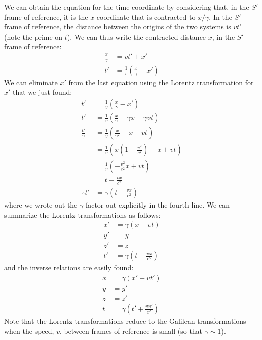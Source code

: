 We can obtain the equation for the time coordinate by considering that, in the $S'$ frame of reference, it is the $x$ coordinate that is contracted to $x/\gamma$. In the $S'$ frame of reference, the distance between the origins of the two systems is $vt'$ (note the prime on $t$). We can thus write the contracted distance $x$, in the $S'$ frame of reference:
\begin{align*}
\frac{x}{\gamma}&=vt'+x'\\
t'&= \frac{1}{v}\left(\frac{x}{\gamma}-x'\right)
\end{align*}
We can eliminate $x'$ from the last equation using the Lorentz transformation for $x'$ that we just found:
\begin{align*}
t'&= \frac{1}{v}\left(\frac{x}{\gamma}-x'\right)\\
t'&= \frac{1}{v}\left(\frac{x}{\gamma}-\gamma x+\gamma vt\right)\\
\frac{t'}{\gamma}&=\frac{1}{v}\left(\frac{x}{\gamma^2}-x+vt\right)\\
&=\frac{1}{v}\left(x\left(1-\frac{v^2}{c^2}\right)-x+vt\right)\\
&=\frac{1}{v}\left(-\frac{v^2}{c^2}x+vt\right)\\
&=t-\frac{vx}{c^2}\\
\therefore t'&=\gamma\left(t-\frac{vx}{c^2} \right)
\end{align*}
where we wrote out the $\gamma$ factor out explicitly in the fourth line. We can summarize the Lorentz transformations as follows:
\begin{align*}
x' &=\gamma (x-vt)\\
y' &= y\\
z' &= z\\
t' &=\gamma\left(t-\frac{vx}{c^2} \right)
\end{align*}
and the inverse relations are easily found:
\begin{align*}
x &=\gamma (x'+vt')\\
y &= y'\\
z &= z'\\
t &=\gamma\left(t'+\frac{vx'}{c^2} \right)
\end{align*}
Note that the Lorentz transformations reduce to the Galilean transformations when the speed, $v$, between frames of reference is small (so that $\gamma \sim 1$).

